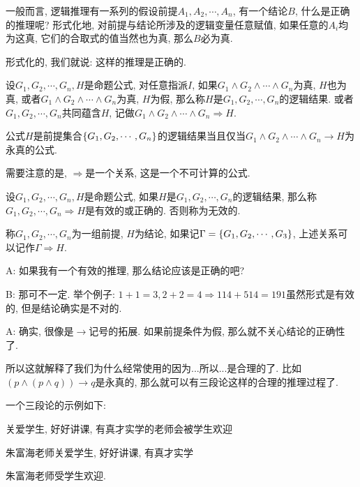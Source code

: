 一般而言, 逻辑推理有一系列的假设前提$A_1,A_2,\cdots,A_n$, 有一个结论$B$, 什么是正确的推理呢? 形式化地, 对前提与结论所涉及的逻辑变量任意赋值, 如果任意的$A_i$均为这真, 它们的合取式的值当然也为真, 那么$B$必为真. 

形式化的, 我们就说: 这样的推理是正确的. 

\begin{definition}
	设$G_1,G_2,\cdots,G_n,H$是命题公式, 对任意指派$I$, 如果$G_1\land G_2\land \cdots\land G_n$为真, $H$也为真, 或者$G_1\land G_2\land \cdots\land G_n$为真, $H$为假, 那么称$H$是$G_1, G_2, \cdots, G_n$的逻辑结果. 或者$G_1, G_2, \cdots, G_n$共同蕴含$H$, 记做$G_1\land G_2\land \cdots\land G_n\Rightarrow H$. 
\end{definition}


\begin{theorem}
	公式$H$是前提集合$\{G_1,G_2,\cdots,G_n\}$的逻辑结果当且仅当$G_1\land G_2\land \cdots\land G_n\to H$为永真的公式. 
\end{theorem}

需要注意的是, $\Rightarrow$是一个关系, 这是一个不可计算的公式. 

\begin{definition}
	设$G_1, G_2, \cdots, G_n,H$是命题公式, 如果$H$是$G_1, G_2, \cdots, G_n$的逻辑结果, 那么称$G_1, G_2, \cdots, G_n\Rightarrow H$是有效的或正确的. 否则称为无效的. 
	
	称$G_1, G_2, \cdots, G_n$为一组前提, $H$为结论, 如果记$\Gamma=\{G_1,G_2,\cdots,G_3\}$, 上述关系可以记作$\Gamma\Rightarrow H$. 
\end{definition}

\begin{dialogue}
	A: 如果我有一个有效的推理, 那么结论应该是正确的吧? 
	
	B: 那可不一定. 举个例子: $1+1=3, 2+2=4 \Rightarrow 114+514=191$虽然形式是有效的, 但是结论确实是不对的.
	
	A: 确实, 很像是$\rightarrow$记号的拓展. 如果前提条件为假, 那么就不关心结论的正确性了. 
\end{dialogue}

所以这就解释了我们为什么经常使用的因为...所以...是合理的了. 比如$(p\land(p\land q))\to q$是永真的, 那么就可以有三段论这样的合理的推理过程了. 

\begin{example}
	一个三段论的示例如下: 
	
	关爱学生, 好好讲课, 有真才实学的老师会被学生欢迎
	
	朱富海老师关爱学生, 好好讲课, 有真才实学
	
	朱富海老师受学生欢迎. 
\end{example}

